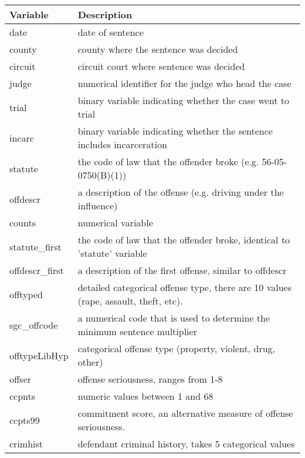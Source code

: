 \begin{tabular}{|l|l|}
\hline
\textbf{Variable} & \textbf{Description}                                             \\ \hline
date              & date of sentence                                                 \\ \hline
county            & county where the sentence was decided                            \\ \hline
circuit           & circuit court where sentence was decided                         \\ \hline
judge             & numerical identifier for the judge who head the case             \\ \hline
trial             & binary variable indicating whether the case went to trial        \\ \hline
incarc         & binary variable indicating whether the sentence includes incarceration                \\ \hline
statute           & the code of law that the offender broke (e.g. 56-05-0750(B)(1))  \\ \hline
offdescr          & a description of the offense (e.g. driving under the influence)  \\ \hline
counts            & numerical variable                                               \\ \hline
statute\_first & the code of law that the offender broke, identical to 'statute' variable              \\ \hline
offdescr\_first   & a description of the first offense, similar to offdescr          \\ \hline
offtyped       & detailed categorical offense type, there are 10 values (rape, assault,   theft, etc). \\ \hline
sgc\_offcode   & a numerical code that is used to determine the minimum sentence   multiplier          \\ \hline
offtypeLibHyp     & categorical offense type (property, violent, drug, other)        \\ \hline
offser            & offense seriousness, ranges from 1-8                             \\ \hline
ccpnts            & numeric values between 1 and 68                                  \\ \hline
ccpts99           & commitment score, an alternative measure of offense seriousness. \\ \hline
crimhist          & defendant criminal history, takes 5 categorical values           \\ \hline

\end{tabular}
